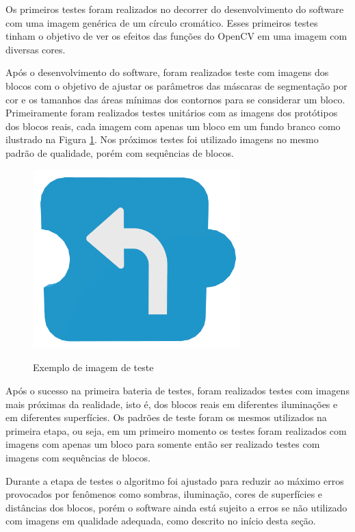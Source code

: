     Os primeiros testes foram realizados no decorrer do desenvolvimento do software com uma imagem genérica de um círculo cromático. Esses primeiros testes tinham o objetivo de ver os efeitos das funções do OpenCV em uma imagem com diversas cores.
    
    Após o desenvolvimento do software, foram realizados teste com imagens dos blocos com o objetivo de ajustar os parâmetros das máscaras de segmentação por cor e os tamanhos das áreas mínimas dos contornos para se considerar um bloco. Primeiramente foram realizados testes unitários com as imagens dos protótipos dos blocos reais, cada imagem com apenas um bloco em um fundo branco como ilustrado na Figura \ref{figura:ex_teste}. Nos próximos testes foi utilizado imagens no mesmo padrão de qualidade, porém com sequências de blocos.
       
    \begin{figure}[H]
        \caption{Exemplo de imagem de teste}
        \centering
        \includegraphics[width=8cm]{Imagens/Cap3/Blocos/Virar.png}
        \label{figura:ex_teste}
    \end{figure}
    
    Após o sucesso na primeira bateria de testes, foram realizados testes com imagens mais próximas da realidade, isto é, dos blocos reais em diferentes iluminações e em diferentes superfícies. Os padrões de teste foram os mesmos utilizados na primeira etapa, ou seja, em um primeiro momento os testes foram realizados com imagens com apenas um bloco para somente então ser realizado testes com imagens com sequências de blocos.
    
    Durante a etapa de testes o algoritmo foi ajustado para reduzir ao máximo erros provocados por fenômenos como sombras, iluminação, cores de superfícies e distâncias dos blocos, porém o software ainda está sujeito a erros se não utilizado com imagens em qualidade adequada, como descrito no início desta seção.    

